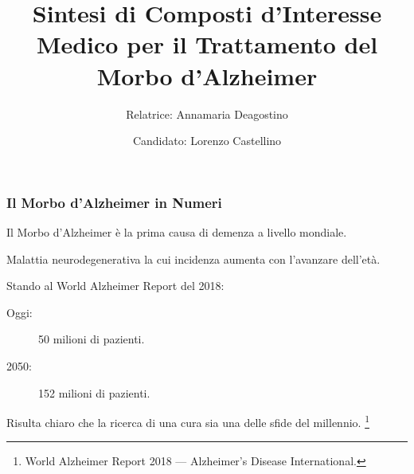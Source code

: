 \documentclass[9pt]{beamer}
\title{Sintesi di Composti d'Interesse Medico per il Trattamento del Morbo d'Alzheimer}
\author{
	Relatrice: Annamaria Deagostino \\
	\and
	Candidato: Lorenzo Castellino
}
\date{\center{Anno Accademico 2017-2018}}
\newcommand\blfootnote[1]{%
	\begingroup
	\renewcommand\thefootnote{}\footnote{#1}%
	\addtocounter{footnote}{-1}%
	\endgroup
}
\begin{document}
\begin{frame}

	\titlepage
\end{frame}

\begin{frame}
	\frametitle{Il Morbo d'Alzheimer in Numeri}
	Il Morbo d'Alzheimer è la prima causa di demenza a livello mondiale.
	
	Malattia neurodegenerativa la cui incidenza aumenta con l'avanzare dell'età.
	
	Stando al World Alzheimer Report del 2018:
	
	\begin{description}
		\item [Oggi:] 50 milioni di pazienti.
		      
		\item [2050:] 152 milioni di pazienti.
		      
	\end{description}
	
	Risulta chiaro che la ricerca di una cura sia una delle sfide del millennio. \blfootnote{World Alzheimer Report 2018 — Alzheimer’s Disease International.}
\end{frame}
\end{document}
